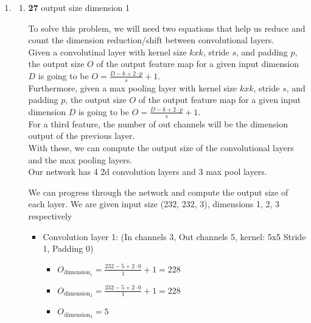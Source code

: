 \documentclass[12pt]{article}
\begin{document}
\begin{enumerate}
\item
  \begin{enumerate}
  \item \textbf{27} output size dimension 1

  To solve this problem, we will need two equations that help us reduce and count the dimension reduction/shift between convolutional layers. \\ 

  Given a convolutinal layer with kernel size $k x k$, stride $s$, and padding $p$, the output size $O$ of the output feature map for a given input dimension $D$ is going to be $O = \frac{D - k + 2 \cdot p}{s} + 1$. \\ 
  Furthermore, given a max pooling layer with kernel size $k x k$, stride $s$, and padding $p$, the output size $O$ of the output feature map for a given input dimension $D$ is going to be $O = \frac{D - k + 2 \cdot p}{s} + 1$. \\
  For a third feature, the number of out channels will be the dimension output of the previous layer. \\ 

  With these, we can compute the output size of the convolutional layers and the max pooling layers. \\ 
  Our network has 4 2d convolution layers and 3 max pool layers.

  We can progress through the network and compute the output size of each layer. We are given input size (232, 232, 3), dimensions 1, 2, 3 respectively \\ 
  \begin{itemize}
    \item Convolution layer 1: (In channels 3, Out channels 5, kernel: 5x5 Stride 1, Padding 0)\\ 
      \begin{itemize}
        \item $O_{\text{dimension}_1} = \frac{232 - 5 + 2 \cdot 0}{1} + 1 = 228$ 
        \item$O_{\text{dimension}_2} = \frac{232 - 5 + 2 \cdot 0}{1} + 1 = 228$ 
        \item $O_{\text{dimension}_3} = 5$ 
      \end{itemize}


\end{itemize}
\end{enumerate}
\end{enumerate}
\end{document}
